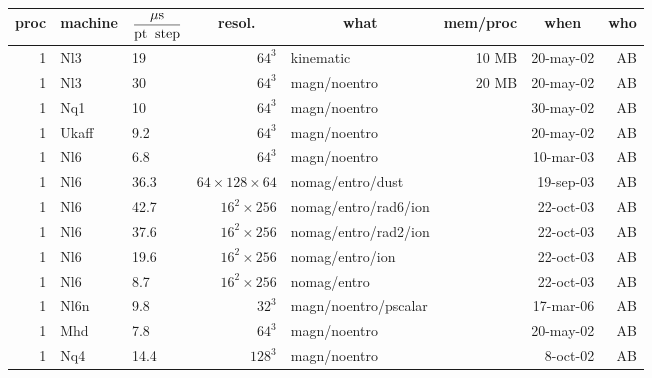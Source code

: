 \documentclass[\mydriver,12pt,twoside,notitlepage,a4paper]{article}
\newcommand{\mcc}[1]{\multicolumn{1}{c}{#1}}
\begin{document}
\small %
\begin{center}
    \begin{small}
    \begin{longtable}{rllrlrrr}
    \toprule
   \mcc{proc}
     & \mcc{machine}
             & \mcc{$\displaystyle\frac{{\mu\rm s}}{\rm pt\;\;step}$}
                    & \mcc{resol.}
                              & \mcc{what}
                                             & \mcc{mem/proc}
                                                      & \mcc{when}&\mcc{who}\\
    \midrule
   1 & Nl3   &  19  &  $64^3$ & kinematic    &  10 MB & 20-may-02 & AB \\
   1 & Nl3   &  30  &  $64^3$ & magn/noentro &  20 MB & 20-may-02 & AB \\
   1 & Nq1   &  10  &  $64^3$ & magn/noentro &        & 30-may-02 & AB \\
   1 & Ukaff & 9.2  &  $64^3$ & magn/noentro &        & 20-may-02 & AB \\
   1 & Nl6   & 6.8  &  $64^3$ & magn/noentro &        & 10-mar-03 & AB \\
   1 & Nl6   & 36.3 &  $64\!\times\!128\!\times\!64$
                              & nomag/entro/dust &    & 19-sep-03 & AB \\
   1 & Nl6   & 42.7 & $16^2{\times}256$
                     & nomag/entro/rad6/ion &        & 22-oct-03 & AB \\
   1 & Nl6   & 37.6 & $16^2{\times}256$
                     & nomag/entro/rad2/ion &        & 22-oct-03 & AB \\
   1 & Nl6   & 19.6 & $16^2{\times}256$
                      & nomag/entro/ion &      & 22-oct-03 & AB \\
   1 & Nl6   &  8.7 & $16^2{\times}256$ & nomag/entro &      & 22-oct-03 & AB \\
   1 & Nl6n  &  9.8 & $32^3$
                    & magn/noentro/pscalar   &        & 17-mar-06 & AB \\
   1 & Mhd   & 7.8  &  $64^3$ & magn/noentro &        & 20-may-02 & AB \\
   1 & Nq4   &14.4  & $128^3$ & magn/noentro &        &  8-oct-02 & AB \\

\end{longtable}
\end{small}
\end{center}
\end{document}
